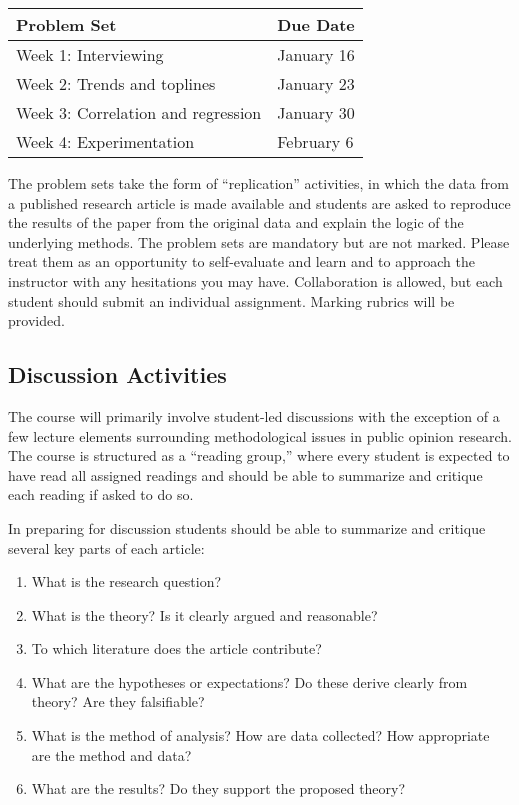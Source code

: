 \documentclass[12pt,a4paper]{article}
\begin{document}
\begin{center}
\begin{tabular}{ll} \hline
\textbf{Problem Set} & \textbf{Due Date} \\ \hline
Week 1: Interviewing & January 16 \\
Week 2: Trends and toplines & January 23 \\
Week 3: Correlation and regression & January 30 \\
Week 4: Experimentation & February 6 \\ \hline
\end{tabular}
\end{center}

The problem sets take the form of ``replication'' activities, in which the data from a published research article is made available and students are asked to reproduce the results of the paper from the original data and explain the logic of the underlying methods. The problem sets are mandatory but are not marked. Please treat them as an opportunity to self-evaluate and learn and to approach the instructor with any hesitations you may have. Collaboration is allowed, but each student should submit an individual assignment. Marking rubrics will be provided.

\subsection{Discussion Activities}

The course will primarily involve student-led discussions with the exception of a few lecture elements surrounding methodological issues in public opinion research. The course is structured as a ``reading group,'' where every student is expected to have read all assigned readings and should be able to summarize and critique each reading if asked to do so.

In preparing for discussion students should be able to summarize and critique several key parts of each article:

\begin{enumerate}
\item What is the research question?
\item What is the theory? Is it clearly argued and reasonable?
\item To which literature does the article contribute?
\item What are the hypotheses or expectations? Do these derive clearly from theory? Are they falsifiable?
\item What is the method of analysis? How are data collected? How appropriate are the method and data?
\item What are the results? Do they support the proposed theory?
\end{enumerate}
\end{document}
